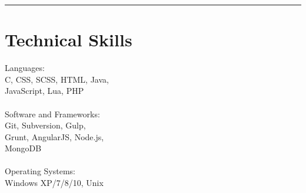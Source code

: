 \noindent\rule{0.9\hsize}{0.4pt}
\section{\normalsize{Technical Skills}}

Languages:\\
C, CSS, SCSS, HTML, Java,\\
JavaScript, Lua, PHP\\
\\
Software and Frameworks:\\
Git, Subversion, Gulp,\\
Grunt, AngularJS, Node.js,\\
MongoDB\\
\\
Operating Systems:\\
Windows XP/7/8/10, Unix\\
